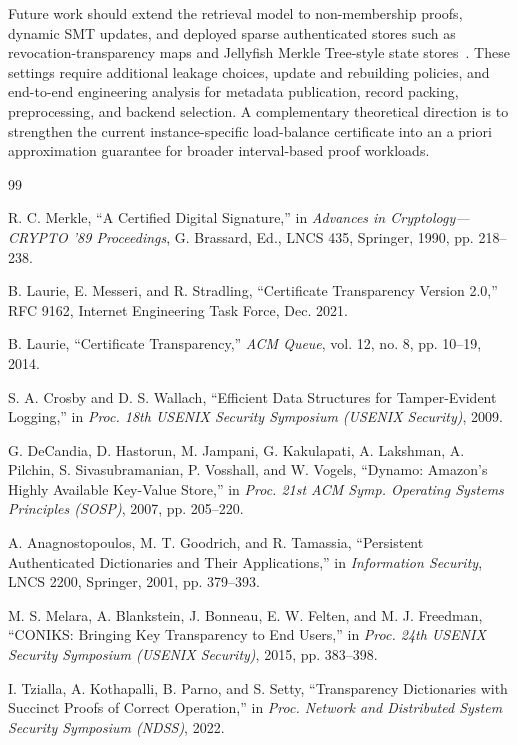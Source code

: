 Future work should extend the retrieval model to non-membership proofs, dynamic SMT updates, and deployed sparse authenticated stores such as revocation-transparency maps and Jellyfish Merkle Tree-style state stores~\cite{revtrans,jmt}. These settings require additional leakage choices, update and rebuilding policies, and end-to-end engineering analysis for metadata publication, record packing, preprocessing, and backend selection. A complementary theoretical direction is to strengthen the current instance-specific load-balance certificate into an a priori approximation guarantee for broader interval-based proof workloads.

\begin{thebibliography}{99}

R. C. Merkle,
\newblock ``A Certified Digital Signature,''
\newblock in \emph{Advances in Cryptology---CRYPTO '89 Proceedings}, G. Brassard, Ed., LNCS 435, Springer, 1990, pp. 218--238.

B. Laurie, E. Messeri, and R. Stradling,
\newblock ``Certificate Transparency Version 2.0,''
\newblock RFC 9162, Internet Engineering Task Force, Dec. 2021.

B. Laurie,
\newblock ``Certificate Transparency,''
\newblock \emph{ACM Queue}, vol. 12, no. 8, pp. 10--19, 2014.

S. A. Crosby and D. S. Wallach,
\newblock ``Efficient Data Structures for Tamper-Evident Logging,''
\newblock in \emph{Proc. 18th USENIX Security Symposium (USENIX Security)}, 2009.

G. DeCandia, D. Hastorun, M. Jampani, G. Kakulapati, A. Lakshman, A. Pilchin, S. Sivasubramanian, P. Vosshall, and W. Vogels,
\newblock ``Dynamo: Amazon's Highly Available Key-Value Store,''
\newblock in \emph{Proc. 21st ACM Symp. Operating Systems Principles (SOSP)}, 2007, pp. 205--220.

A. Anagnostopoulos, M. T. Goodrich, and R. Tamassia,
\newblock ``Persistent Authenticated Dictionaries and Their Applications,''
\newblock in \emph{Information Security}, LNCS 2200, Springer, 2001, pp. 379--393.

M. S. Melara, A. Blankstein, J. Bonneau, E. W. Felten, and M. J. Freedman,
\newblock ``CONIKS: Bringing Key Transparency to End Users,''
\newblock in \emph{Proc. 24th USENIX Security Symposium (USENIX Security)}, 2015, pp. 383--398.

I. Tzialla, A. Kothapalli, B. Parno, and S. Setty,
\newblock ``Transparency Dictionaries with Succinct Proofs of Correct Operation,''
\newblock in \emph{Proc. Network and Distributed System Security Symposium (NDSS)}, 2022.


\end{thebibliography}
